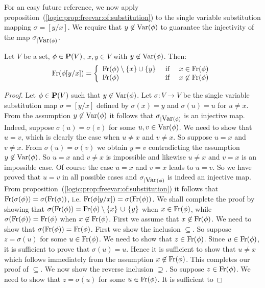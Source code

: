 For an easy future reference, we now apply
proposition~(\ref{logic:prop:freevar:of:substitution}) to the single
variable substitution mapping $\sigma=[y/x]$. We require that
$y\not\in\mbox{\rm Var}(\phi)$ to guarantee the injectivity of the map
$\sigma_{|\mbox{\rm Var}(\phi)}$.
\begin{prop}\label{logic:prop:freevar:single:subst}
Let $V$ be a set, $\phi\in\mbox{${\bf P}(V)$}$, $x,y\in V$  with $y\not\in\mbox{\rm Var}(\phi)$. Then:
    \[
    \free(\phi[y/x])=\left\{\begin{array}{lcl}
    \free(\phi)\setminus\{x\}\cup\{y\}&\mbox{\ if\ }&x\in\free(\phi)\\
    \free(\phi)&\mbox{\ if\ }&x\not\in\free(\phi)
    \end{array}
    \right.
    \]
\end{prop}
\begin{proof}
Let $\phi\in\mbox{${\bf P}(V)$}$ such that $y\not\in\mbox{\rm Var}(\phi)$. Let $\sigma:V\to V$
be the single variable substitution map $\sigma=[y/x]$ defined by
$\sigma(x)=y$ and $\sigma(u)=u$ for $u\neq x$. From the assumption
$y\not\in\mbox{\rm Var}(\phi)$ it follows that $\sigma_{|\mbox{\rm Var}(\phi)}$ is an
injective map. Indeed, suppose $\sigma(u)=\sigma(v)$ for some
$u,v\in\mbox{\rm Var}(\phi)$. We need to show that $u=v$, which is clearly the
case when $u\neq x$ and $v\neq x$. So suppose $u=x$ and $v\neq x$.
From $\sigma(u)=\sigma(v)$ we obtain $y=v$ contradicting the
assumption $y\not\in\mbox{\rm Var}(\phi)$. So $u=x$ and $v\neq x$ is
impossible and likewise $u\neq x$ and $v=x$ is an impossible case.
Of course the case $u=x$ and $v=x$ leads to $u=v$. So we have proved
that $u=v$ in all possible cases and $\sigma_{|\mbox{\rm Var}(\phi)}$ is
indeed an injective map. From
proposition~(\ref{logic:prop:freevar:of:substitution}) it follows
that $\mbox{\rm Fr}(\sigma(\phi))=\sigma(\mbox{\rm Fr}(\phi))$, i.e.
$\mbox{\rm Fr}(\phi[y/x])=\sigma(\mbox{\rm Fr}(\phi))$. We shall complete the proof
by showing that
$\sigma(\mbox{\rm Fr}(\phi))=\mbox{\rm Fr}(\phi)\setminus\{x\}\,\cup\,\{y\}$ when
$x\in\mbox{\rm Fr}(\phi)$, while $\sigma(\mbox{\rm Fr}(\phi))=\mbox{\rm Fr}(\phi)$ when
$x\not\in\mbox{\rm Fr}(\phi)$.  First we assume that $x\not\in\mbox{\rm Fr}(\phi)$.
We need to show that $\sigma(\mbox{\rm Fr}(\phi))=\mbox{\rm Fr}(\phi)$. First we
show the inclusion $\subseteq$. So suppose $z=\sigma(u)$ for some
$u\in\mbox{\rm Fr}(\phi)$. We need to show that $z\in\mbox{\rm Fr}(\phi)$. Since
$u\in\mbox{\rm Fr}(\phi)$, it is sufficient to prove that $\sigma(u)=u$.
Hence it is sufficient to show that $u\neq x$ which follows
immediately from the assumption $x\not\in\mbox{\rm Fr}(\phi)$. This
completes our proof of $\subseteq$. We now show the reverse
inclusion $\supseteq$. So suppose $z\in\mbox{\rm Fr}(\phi)$. We need to show
that $z=\sigma(u)$ for some $u\in\mbox{\rm Fr}(\phi)$. It is sufficient to

\end{proof}
